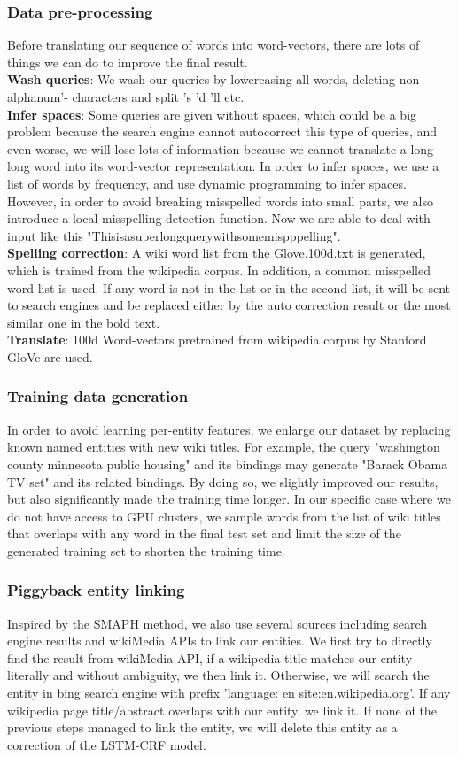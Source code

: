\documentclass{article}
\begin{document}
\subsubsection{Data pre-processing}
Before translating our sequence of words into word-vectors, there are lots of things we can do to improve the final result. \\
{\bf Wash queries}: We wash our queries by lowercasing all words, deleting non alphanum'- characters and split {'s 'd 'll} etc. \\
{\bf Infer spaces}: Some queries are given without spaces, which could be a big problem because the search engine cannot autocorrect this type of queries, and even worse, we will lose lots of information because we cannot translate a long long word into its word-vector representation. In order to infer spaces, we use a list of words by frequency, and use dynamic programming to infer spaces. However, in order to avoid breaking misspelled words into small parts, we also introduce a local misspelling detection function. 
Now we are able to deal with input like this "Thisisasuperlongquerywithsomemispppelling".\\
{\bf Spelling correction}: A wiki word list from the Glove.100d.txt is generated, which is trained from the wikipedia corpus. In addition, a common misspelled word list is used. If any word is not in the list or in the second list, it will be sent to search engines and be replaced either by the auto correction result or the most similar one in the bold text.\\
{\bf Translate}: 100d Word-vectors pretrained from wikipedia corpus by Stanford GloVe are used.
\subsubsection{Training data generation}
In order to avoid learning per-entity features, we enlarge our dataset by replacing known named entities with new wiki titles. For example, the query "washington county minnesota public housing" and its bindings may generate "Barack Obama TV set" and its related bindings. By doing so, we slightly improved our results, but also significantly made the training time longer. 
In our specific case where we do not have access to GPU clusters, we sample words from the list of wiki titles that overlaps with any word in the final test set and limit the size of the generated training set to shorten the training time.
\subsubsection{Piggyback entity linking}
Inspired by the SMAPH method, we also use several sources including search engine results and wikiMedia APIs to link our entities. We first try to directly find the result from wikiMedia API, if a wikipedia title matches our entity literally and without ambiguity, we then link it. Otherwise, we will search the entity in bing search engine with prefix 'language: en site:en.wikipedia.org'. If any wikipedia page title/abstract overlaps with our entity, we link it. If none of the previous steps managed to link the entity, we will delete this entity as a correction of the LSTM-CRF model.
\end{document}
